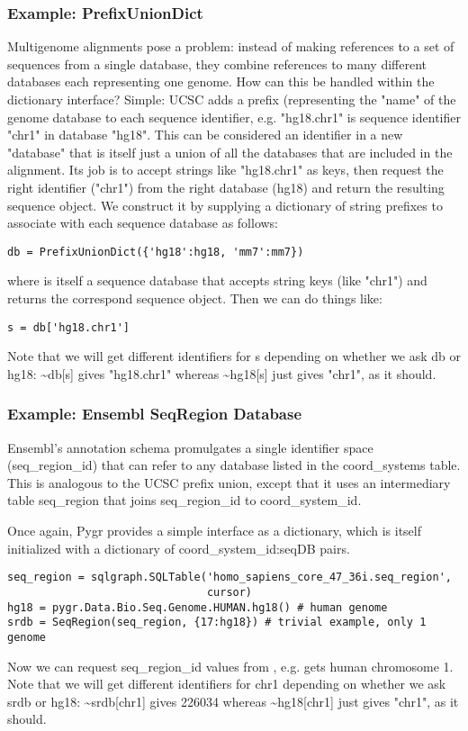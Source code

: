 \documentclass{howto}
\begin{document}
\begin{itemize}
\subsubsection{Example: PrefixUnionDict}
Multigenome alignments pose a problem: instead of making references to 
a set of sequences from a single database, they combine references to many
different databases each representing one genome.  How can this be handled
within the dictionary interface?  Simple: UCSC adds a prefix (representing the
"name" of the genome database to each sequence identifier, e.g. "hg18.chr1" is
sequence identifier "chr1" in database "hg18".  This can be considered an
identifier in a new "database" that is itself just a union of all the databases
that are included in the alignment.  Its job is to accept strings like "hg18.chr1"
as keys, then request the right identifier ("chr1") from the right database (hg18)
and return the resulting sequence object.
We construct it by supplying a dictionary of string prefixes to associate
with each sequence database as follows:
\begin{verbatim}
db = PrefixUnionDict({'hg18':hg18, 'mm7':mm7})
\end{verbatim}
where  is itself a sequence database that accepts string keys
(like "chr1") and returns the correspond sequence object.  Then we can
do things like:
\begin{verbatim}
s = db['hg18.chr1']
\end{verbatim}
Note that we will get different identifiers for s depending on whether
we ask db or hg18: \textasciitilde db[s] gives "hg18.chr1" whereas
\textasciitilde hg18[s] just gives "chr1", as it should.
\end{itemize}

\subsubsection{Example: Ensembl SeqRegion Database}
Ensembl's annotation schema promulgates a single identifier space
(seq_region_id) that can refer to any database listed in the 
coord_systems table.  This is analogous to the UCSC prefix union,
except that it uses an intermediary table seq_region that joins
seq_region_id to coord_system_id.  

Once again, Pygr provides a simple interface as a dictionary, which
is itself initialized with a dictionary of {coord_system_id:seqDB}
pairs.
\begin{verbatim}
seq_region = sqlgraph.SQLTable('homo_sapiens_core_47_36i.seq_region',
                               cursor) 
hg18 = pygr.Data.Bio.Seq.Genome.HUMAN.hg18() # human genome
srdb = SeqRegion(seq_region, {17:hg18}) # trivial example, only 1 genome
\end{verbatim}
Now we can request seq_region_id values from , e.g. 
 gets human chromosome 1.
Note that we will get different identifiers for chr1 depending on whether
we ask srdb or hg18: \textasciitilde srdb[chr1] gives 226034 whereas
\textasciitilde hg18[chr1] just gives "chr1", as it should.
\end{document}
